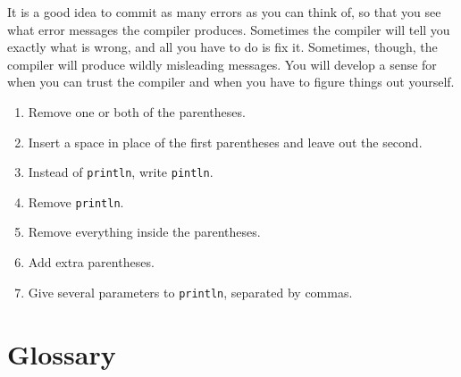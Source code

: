 \documentclass[10pt]{book}
\begin{document}
\begin{ex}

It is a good idea to commit as many errors as you can think of,
so that you see what error messages the compiler produces.
Sometimes the compiler will tell you exactly what is wrong, and all
you have to do is fix it.  Sometimes, though, the compiler will produce
wildly misleading messages.  You will develop a sense for when you can
trust the compiler and when you have to figure things out yourself.

\begin {enumerate}

\item Remove one or both of the parentheses.

\item Insert a space in place of the first parentheses and leave out the second.

\item Instead of {\tt println}, write {\tt pintln}.

\item Remove {\tt println}.

\item Remove everything inside the parentheses.

\item Add extra parentheses.

\item Give several parameters to {\tt println}, separated by commas.

\end {enumerate}
\end{ex}

\section{Glossary}
\end{document}
